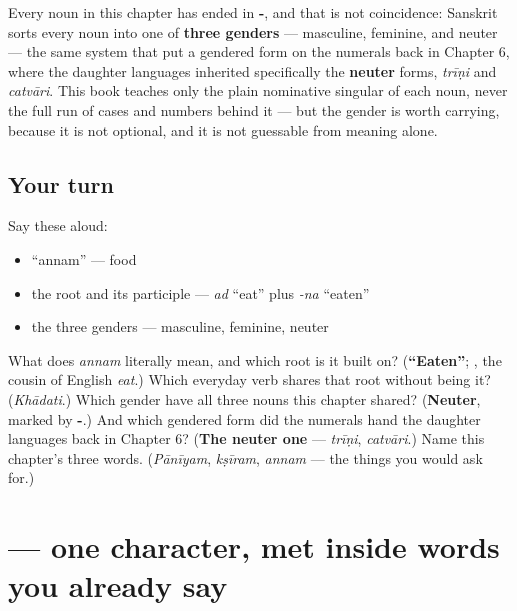 \begin{grammarlens}[title={Grammar Lens: three genders, one small system}]
Every noun in this chapter has ended in \textbf{-}, and that is not coincidence: Sanskrit sorts every noun into one of \textbf{three genders} — masculine, feminine, and neuter — the same system that put a gendered form on the numerals back in Chapter 6, where the daughter languages inherited specifically the \textbf{neuter} forms, \emph{trīṇi} and \emph{catvāri}. This book teaches only the plain nominative singular of each noun, never the full run of cases and numbers behind it — but the gender is worth carrying, because it is not optional, and it is not guessable from meaning alone.
\end{grammarlens}

\subsection*{Your turn}
Say these aloud:

\begin{itemize}
\raggedright
  \item \textquotedblleft{}annam\textquotedblright{} — food
  \item the root and its participle — \emph{ad} \textquotedblleft{}eat\textquotedblright{} plus \emph{-na} \textquotedblleft{}eaten\textquotedblright{}
  \item the three genders — masculine, feminine, neuter
\end{itemize}

\begin{tcolorbox}[breakable,colback=teal!4,colframe=teal!35!black,title={Before you move on}]
What does \emph{annam} literally mean, and which root is it built on? (\textbf{\textquotedblleft{}Eaten\textquotedblright{}}; \textbf{}, the cousin of English \emph{eat}.) Which everyday verb shares that root without being it? (\emph{Khādati}.) Which gender have all three nouns this chapter shared? (\textbf{Neuter}, marked by \textbf{-}.) And which gendered form did the numerals hand the daughter languages back in Chapter 6? (\textbf{The neuter one} — \emph{trīṇi}, \emph{catvāri}.) Name this chapter's three words. (\emph{Pānīyam}, \emph{kṣīram}, \emph{annam} — the things you would ask for.)
\end{tcolorbox}
\section[\texorpdfstring{\sk{ी} (ī)}{ी (ī)}]{ — one character, met inside words you already say}

